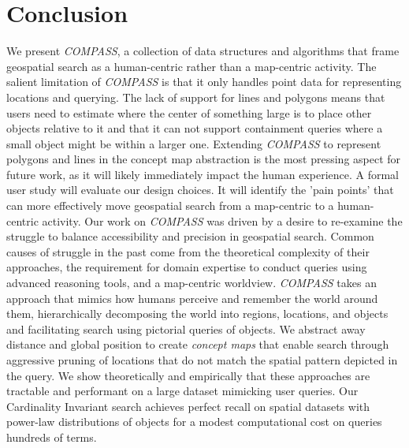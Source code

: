 \section{Conclusion}
\label{section:conclusion}

We present \emph{COMPASS}, a collection of data structures and algorithms that frame geospatial search as a human-centric rather than a map-centric activity. 
%
The salient limitation of \emph{COMPASS} is that it only handles point data for representing locations and querying.
The lack of support for lines and polygons means that users need to estimate where the center of something large is to place other objects relative to it and that it can not support containment queries where a small object might be within a larger one. 
Extending \emph{COMPASS} to represent polygons and lines in the concept map abstraction is the most pressing aspect for future work, as it will likely immediately impact the human experience.
A formal user study will evaluate our design choices.
It will identify the 'pain points' that can more effectively move geospatial search from a map-centric to a human-centric activity.
%
Our work on \emph{COMPASS} was driven by a desire to re-examine the struggle to balance accessibility and precision in geospatial search. 
Common causes of struggle in the past come from the theoretical complexity of their approaches, the requirement for domain expertise to conduct queries using advanced reasoning tools, and a map-centric worldview. 
\emph{COMPASS} takes an approach that mimics how humans perceive and remember the world around them, hierarchically decomposing the world into regions, locations, and objects and facilitating search using pictorial queries of objects. 
We abstract away distance and global position to create \textit{concept maps} that enable search through aggressive pruning of locations that do not match the spatial pattern depicted in the query.
We show theoretically and empirically that these approaches are tractable and performant on a large dataset mimicking user queries.
Our Cardinality Invariant search achieves perfect recall on spatial datasets with power-law distributions of objects for a modest computational cost on queries hundreds of terms.

 

 




